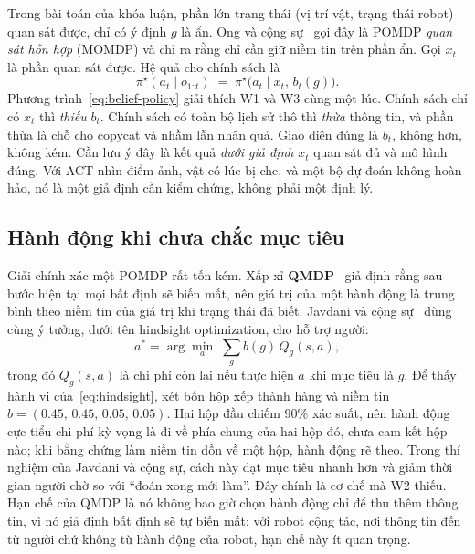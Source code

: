 Trong bài toán của khóa luận, phần lớn trạng thái (vị trí vật, trạng thái robot) quan sát được, chỉ có ý định $g$ là ẩn. Ong và cộng sự~\cite{ong2010momdp} gọi đây là POMDP \emph{quan sát hỗn hợp} (MOMDP) và chỉ ra rằng chỉ cần giữ niềm tin trên phần ẩn. Gọi $x_t$ là phần quan sát được. Hệ quả cho chính sách là
\begin{equation}
  \pi^\star(a_t\mid o_{1:t})\;=\;\pi^\star\big(a_t\mid x_t,\,b_t(g)\big).
  \label{eq:belief-policy}
\end{equation}
Phương trình~\eqref{eq:belief-policy} giải thích W1 và W3 cùng một lúc. Chính sách chỉ có $x_t$ thì \emph{thiếu} $b_t$. Chính sách có toàn bộ lịch sử thô thì \emph{thừa} thông tin, và phần thừa là chỗ cho copycat và nhầm lẫn nhân quả. Giao diện đúng là $b_t$, không hơn, không kém. Cần lưu ý đây là kết quả \emph{dưới giả định} $x_t$ quan sát đủ và mô hình đúng. Với ACT nhìn điểm ảnh, vật có lúc bị che, và một bộ dự đoán không hoàn hảo, nó là một giả định cần kiểm chứng, không phải một định lý.

\subsection{Hành động khi chưa chắc mục tiêu}

Giải chính xác một POMDP rất tốn kém. Xấp xỉ \textbf{QMDP}~\cite{littman1995learning} giả định rằng sau bước hiện tại mọi bất định sẽ biến mất, nên giá trị của một hành động là trung bình theo niềm tin của giá trị khi trạng thái đã biết. Javdani và cộng sự~\cite{javdani2018shared} dùng cùng ý tưởng, dưới tên hindsight optimization, cho hỗ trợ người:
\begin{equation}
  a^\ast=\arg\min_a\;\sum_g b(g)\,Q_g(s,a),
  \label{eq:hindsight}
\end{equation}
trong đó $Q_g(s,a)$ là chi phí còn lại nếu thực hiện $a$ khi mục tiêu là $g$. Để thấy hành vi của~\eqref{eq:hindsight}, xét bốn hộp xếp thành hàng và niềm tin $b=(0.45,\,0.45,\,0.05,\,0.05)$. Hai hộp đầu chiếm 90\% xác suất, nên hành động cực tiểu chi phí kỳ vọng là đi về phía chung của hai hộp đó, chưa cam kết hộp nào; khi bằng chứng làm niềm tin dồn về một hộp, hành động rẽ theo. Trong thí nghiệm của Javdani và cộng sự, cách này đạt mục tiêu nhanh hơn và giảm thời gian người chờ so với ``đoán xong mới làm''. Đây chính là cơ chế mà W2 thiếu. Hạn chế của QMDP là nó không bao giờ chọn hành động chỉ để thu thêm thông tin, vì nó giả định bất định sẽ tự biến mất; với robot cộng tác, nơi thông tin đến từ người chứ không từ hành động của robot, hạn chế này ít quan trọng.

